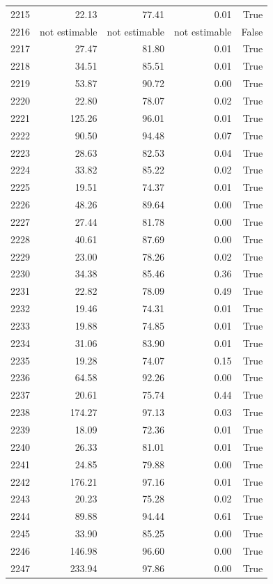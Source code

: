 \begin{longtable}{rrrrr}
2215 & 22.13 & 77.41 & 0.01 & True \\
2216 & not estimable & not estimable & not estimable & False \\
2217 & 27.47 & 81.80 & 0.01 & True \\
2218 & 34.51 & 85.51 & 0.01 & True \\
2219 & 53.87 & 90.72 & 0.00 & True \\
2220 & 22.80 & 78.07 & 0.02 & True \\
2221 & 125.26 & 96.01 & 0.01 & True \\
2222 & 90.50 & 94.48 & 0.07 & True \\
2223 & 28.63 & 82.53 & 0.04 & True \\
2224 & 33.82 & 85.22 & 0.02 & True \\
2225 & 19.51 & 74.37 & 0.01 & True \\
2226 & 48.26 & 89.64 & 0.00 & True \\
2227 & 27.44 & 81.78 & 0.00 & True \\
2228 & 40.61 & 87.69 & 0.00 & True \\
2229 & 23.00 & 78.26 & 0.02 & True \\
2230 & 34.38 & 85.46 & 0.36 & True \\
2231 & 22.82 & 78.09 & 0.49 & True \\
2232 & 19.46 & 74.31 & 0.01 & True \\
2233 & 19.88 & 74.85 & 0.01 & True \\
2234 & 31.06 & 83.90 & 0.01 & True \\
2235 & 19.28 & 74.07 & 0.15 & True \\
2236 & 64.58 & 92.26 & 0.00 & True \\
2237 & 20.61 & 75.74 & 0.44 & True \\
2238 & 174.27 & 97.13 & 0.03 & True \\
2239 & 18.09 & 72.36 & 0.01 & True \\
2240 & 26.33 & 81.01 & 0.01 & True \\
2241 & 24.85 & 79.88 & 0.00 & True \\
2242 & 176.21 & 97.16 & 0.01 & True \\
2243 & 20.23 & 75.28 & 0.02 & True \\
2244 & 89.88 & 94.44 & 0.61 & True \\
2245 & 33.90 & 85.25 & 0.00 & True \\
2246 & 146.98 & 96.60 & 0.00 & True \\
2247 & 233.94 & 97.86 & 0.00 & True \\

\end{longtable}
